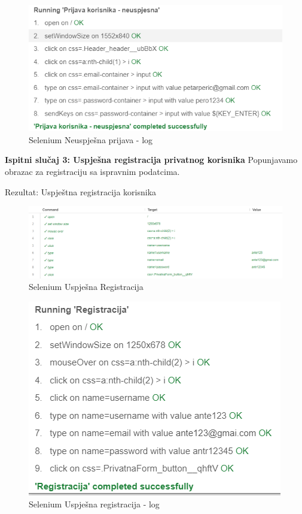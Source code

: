 \begin{figure}[H]
			\includegraphics[scale=0.8]{slike/NeuspjesnaPrijava2.png}
			\centering
			\caption{Selenium Neuspješna prijava - log}
			\label{fig:promjene}
		          \end{figure}

    \textbf{Ispitni slučaj 3: Uspješna registracija privatnog korisnika}
    Popunjavamo obrazac za registraciju sa ispravnim podatcima.
    
    Rezultat: Uspještna registracija korisnika

    \begin{figure}[H]
			\includegraphics[scale=0.5]{slike/UspjesnaRegistracija1.png}
			\centering
			\caption{Selenium Uspješna Registracija}
			\label{fig:promjene}
		          \end{figure}


\begin{figure}[H]
			\includegraphics[scale=0.8]{slike/UspjesnaRegistracija2.png}
			\centering
			\caption{Selenium Uspješna registracija - log}
			\label{fig:promjene}
		          \end{figure}

